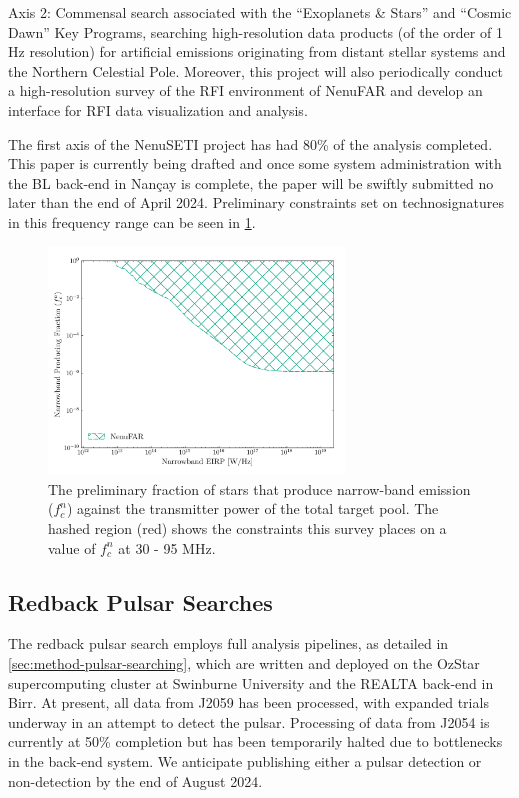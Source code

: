 Axis 2: Commensal search associated with the “Exoplanets \& Stars” and “Cosmic Dawn” Key Programs, searching high-resolution data products (of the order of 1 Hz resolution) for artificial emissions originating from distant stellar systems and the Northern Celestial Pole. Moreover, this project will also periodically conduct a high-resolution survey of the RFI environment of NenuFAR and develop an interface for RFI data visualization and analysis. \

The first axis of the NenuSETI project has had 80\% of the analysis completed. This paper is currently being drafted and once some system administration with the BL back-end in Nançay is complete, the paper will be swiftly submitted no later than the end of April 2024. Preliminary constraints set on technosignatures in this frequency range can be seen in \cref{fig:NenuSETI-Parameter-Space}. 

\begin{figure}[h]
    \centering
    \includegraphics[width = 0.7\textwidth]{figs/NenuFAR-Constraining-Factor.png}
    \caption{The preliminary fraction of stars that produce narrow-band emission ($f^n_c$) against the transmitter power of the total target pool. The hashed region (red) shows the constraints this survey places on a value of $f^n_c$ at 30 - 95 MHz.}
    \label{fig:NenuSETI-Parameter-Space}
\end{figure}

\subsection{Redback Pulsar Searches}
The redback pulsar search employs full analysis pipelines, as detailed in \cref{sec:method-pulsar-searching}, which are written and deployed on the OzStar supercomputing cluster at Swinburne University and the REALTA back-end in Birr. At present, all data from J2059 has been processed, with expanded trials underway in an attempt to detect the pulsar. Processing of data from J2054 is currently at 50\% completion but has been temporarily halted due to bottlenecks in the back-end system. We anticipate publishing either a pulsar detection or non-detection by the end of August 2024. \

